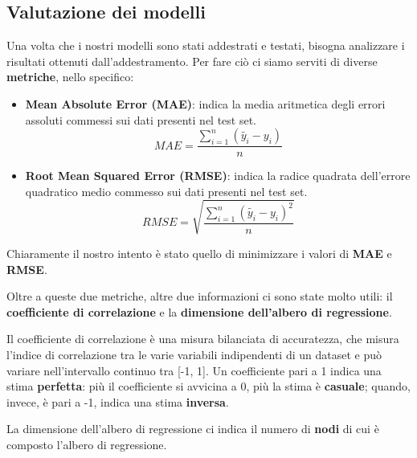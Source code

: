 \documentclass[a4paper, 11pt, oneside]{report}
\begin{document}
                \subsection{Valutazione dei modelli}
                Una volta che i nostri modelli sono stati addestrati e testati, bisogna analizzare i risultati ottenuti
                dall'addestramento. Per fare ciò ci siamo serviti di diverse \textbf{metriche}, nello specifico:
                \begin{itemize}
                    \item \textbf{Mean Absolute Error (MAE)}: indica la media aritmetica degli errori
                    assoluti commessi sui dati presenti nel test set.
                    \[
                        MAE = \frac{\sum_{i=1}^{n}(\tilde{y_i} - y_i)}{n}
                    \]
                    \item \textbf{Root Mean Squared Error (RMSE)}: indica la radice quadrata dell'errore
                    quadratico medio commesso sui dati presenti nel test set.
                    \[
                        RMSE = \sqrt {\frac{\sum_{i=1}^{n}(\tilde{y_i} - y_i)^2}{n}}
                    \]
                \end{itemize}
                \par \noindent Chiaramente il nostro intento è stato quello di minimizzare i valori di \textbf{MAE} e
                \textbf{RMSE}.
                \\
                \par \noindent Oltre a queste due metriche, altre due informazioni ci sono state molto utili: il \textbf{coefficiente
                di correlazione} e la \textbf{dimensione dell'albero di regressione}.
                \\
                \par \noindent Il coefficiente di correlazione è una misura bilanciata di accuratezza, che misura l'indice
                di correlazione tra le varie variabili indipendenti di un dataset e può variare nell'intervallo continuo tra [-1, 1].
                Un coefficiente pari a 1 indica una stima \textbf{perfetta}: più il coefficiente si avvicina a 0, più la
                stima è \textbf{casuale}; quando, invece, è pari a -1, indica una stima \textbf{inversa}.
                \\
                \par \noindent La dimensione dell'albero di regressione ci indica il numero di \textbf{nodi} di cui è
                composto l'albero di regressione.
\end{document}
